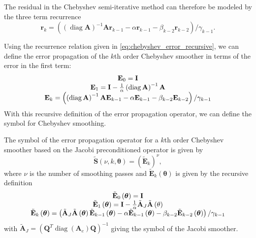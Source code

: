\documentclass[review]{siamart190516}
\DeclareMathOperator{\diag}{diag}
\begin{document}
The residual in the Chebyshev semi-iterative method can therefore be modeled by the three term recurrence
\begin{equation}
\mathbf{r}_k = \left( \left( \diag {\mathbf{A}} \right)^{-1} {\mathbf{A}} \mathbf{r}_{k - 1} - \alpha \mathbf{r}_{k - 1} - \beta_{k - 2} \mathbf{r}_{k - 2} \right) / \gamma_{k - 1}.
\label{eq:chebyshev_error_recursive}
\end{equation}

Using the recurrence relation given in \cref{eq:chebyshev_error_recursive}, we can define the error propagation of the $k$th order Chebyshev smoother in terms of the error in the first term:
\begin{equation}
\begin{tabular}{c}
$\mathbf{E}_0 = \mathbf{I}$\\
$\mathbf{E}_1 = \mathbf{I} - \frac{1}{\alpha} \left( \diag {\mathbf{A}} \right)^{-1} {\mathbf{A}}$\\
$\mathbf{E}_k = \left(\left( \diag {\mathbf{A}} \right)^{-1} {\mathbf{A}} \mathbf{E}_{k - 1} - \alpha \mathbf{E}_{k - 1} - \beta_{k - 2} \mathbf{E}_{k - 2} \right) / \gamma_{k - 1}$
\end{tabular}
\label{eq:chebyshev_error_propagation}
\end{equation}
With this recursive definition of the error propagation operator, we can define the symbol for Chebyshev smoothing.

\begin{definition}\label{def:chebyshev_symbol}
The symbol of the error propagation operator for a $k$th order Chebyshev smoother based on the Jacobi preconditioned operator is given by
\begin{equation}
\tilde{\mathbf{S}} \left( \nu, k, \boldsymbol{\theta} \right) = \left( \tilde{\mathbf{E}}_k \right)^\nu,
\end{equation}
where $\nu$ is the number of smoothing passes and $\tilde{\mathbf{E}}_k \left( \mathbf{\boldsymbol{\theta}} \right)$ is given by the recursive definition
\begin{equation}
\begin{tabular}{c}
$\tilde{\mathbf{E}}_0 \left( \boldsymbol{\theta} \right) = \mathbf{I}$\\
$\tilde{\mathbf{E}}_1 \left( \boldsymbol{\theta} \right) = \mathbf{I} - \frac{1}{\alpha} \tilde{\mathbf{A}}_J \tilde{\mathbf{A}} \left( \mathbf{\theta} \right)$\\
$\tilde{\mathbf{E}}_k \left( \boldsymbol{\theta} \right) = \left( \tilde{\mathbf{A}}_J \tilde{\mathbf{A}} \left( \boldsymbol{\theta} \right) \tilde{\mathbf{E}}_{k - 1} \left( \boldsymbol{\theta} \right) - \alpha \tilde{\mathbf{E}}_{k - 1} \left( \boldsymbol{\theta} \right) - \beta_{k - 2} \tilde{\mathbf{E}}_{k - 2} \left( \boldsymbol{\theta} \right) \right) / \gamma_{k - 1}$
\end{tabular}
\end{equation}
with $\tilde{\mathbf{A}}_J = \left( \mathbf{Q}^T \diag \left( \mathbf{A}_e \right) \mathbf{Q} \right)^{-1}$ giving the symbol of the Jacobi smoother.
\end{definition}
\end{document}

